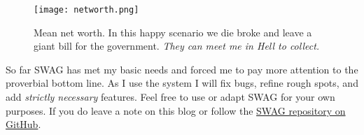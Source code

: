 
\begin{figure}[htbp]
\centering
\texttt{[image: networth.png]}
\caption[Mean net worth. In this happy scenario we die broke]{Mean net worth. In this happy scenario we die broke and leave a giant bill for
the government. \textit{They can meet me in Hell to collect.}}
\label{fig:5175x2}
\end{figure}


So far SWAG has met my basic needs and forced me to pay more
attention to the proverbial bottom line. As I use the system I will fix
bugs, refine rough spots, and add \emph{strictly necessary} features.
Feel free to use or adapt SWAG for your own purposes. If you do leave a
note on this blog or follow the \href{https://github.com/bakerjd99/jacks/tree/master/swag}{SWAG repository on GitHub}.

%
